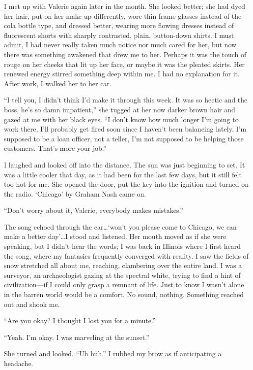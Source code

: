 I met up with Valerie again later in the month. She looked better; she
had dyed her hair, put on her make-up differently, wore thin frame
glasses instead of the cola bottle type, and dressed better, wearing
more flowing dresses instead of fluorescent shorts with sharply
contrasted, plain, button-down shirts. I must admit, I had never really
taken much notice nor much cared for her, but now there was something
awakened that drew me to her. Perhaps it was the touch of rouge on her
cheeks that lit up her face, or maybe it was the pleated skirts. Her
renewed energy stirred something deep within me. I had no explanation
for it. After work, I walked her to her car.

``I tell you, I didn't think I'd make it through this week. It was so
hectic and the boss, he's so damn impatient,'' she tugged at her now
darker brown hair and gazed at me with her black eyes. ``I don't know
how much longer I'm going to work there, I'll probably get fired soon
since I haven't been balancing lately. I'm supposed to be a loan
officer, not a teller, I'm not supposed to be helping those customers.
That's more your job.''

I laughed and looked off into the distance. The sun was just beginning
to set. It was a little cooler that day, as it had been for the last few
days, but it still felt too hot for me. She opened the door, put the key
into the ignition and turned on the radio. `Chicago' by Graham Nash came
on.

``Don't worry about it, Valerie, everybody makes mistakes.''

The song echoed through the car\ldots`won't you please come to Chicago,
we can make a better day'\ldots I stood and listened. Her mouth moved as
if she were speaking, but I didn't hear the words; I was back in
Illinois where I first heard the song, where my fantasies frequently
converged with reality. I saw the fields of snow stretched all about me,
reaching, clambering over the entire land. I was a surveyor, an
archaeologist gazing at the spectral white, trying to find a hint of
civilization---if I could only grasp a remnant of life. Just to know I
wasn't alone in the barren world would be a comfort. No sound, nothing.
Something reached out and shook me.

``Are you okay? I thought I lost you for a minute.''

``Yeah. I'm okay. I was marveling at the sunset.''

She turned and looked. ``Uh huh.'' I rubbed my brow as if anticipating a
headache.

